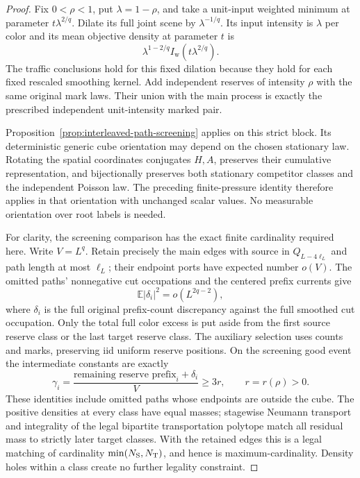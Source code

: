 \documentclass[11pt,reqno]{amsart}
\theoremstyle{definition}
\theoremstyle{remark}
\numberwithin{equation}{section}
\newcommand{\E}{\mathbb E}
\begin{document}
\begin{proof}
Fix \(0<\rho<1\), put \(\lambda=1-\rho\), and take a unit-input
weighted minimum at parameter \(t\lambda^{2/q}\). Dilate its full
joint scene by \(\lambda^{-1/q}\). Its input intensity is
\(\lambda\) per color and its mean objective density at parameter
\(t\) is
\begin{equation}
                  \lambda^{1-2/q}I_{\mathrm w}(t\lambda^{2/q}).
 \label{eq:interleaved-root-dilation}
\end{equation}
The traffic conclusions hold for this fixed dilation because they
hold for each fixed rescaled smoothing kernel. Add independent
reserves of intensity \(\rho\) with the same original mark laws.
Their union with the main process is exactly the prescribed
independent unit-intensity marked pair.

Proposition~\ref{prop:interleaved-path-screening} applies on this
strict block. Its deterministic generic cube orientation may depend
on the chosen stationary law. Rotating the spatial coordinates
conjugates \(H,A\), preserves their cumulative representation, and
bijectionally preserves both stationary competitor classes and the
independent Poisson law. The preceding finite-pressure identity
therefore applies in that orientation with unchanged scalar values.
No measurable orientation over root labels is needed.

For clarity, the screening comparison has the exact finite
cardinality required here. Write \(V=L^q\). Retain precisely the
main edges with source in \(Q_{L-4\ell_L}\) and path length at most
\(\ell_L\); their endpoint ports have expected number \(o(V)\).
The omitted paths' nonnegative cut occupations
and the centered prefix currents give
\[
 \E|\delta_i|^2=o(L^{2q-2}),
\]
where \(\delta_i\) is the full original prefix-count discrepancy
against the full smoothed cut occupation.
Only the total full color excess is put aside from the first source
reserve class or the last target reserve class. The auxiliary
selection uses counts and marks, preserving iid uniform reserve
positions. On the screening good event the intermediate constants
are exactly
\[
 \gamma_i=\frac{\text{remaining reserve prefix}_i+\delta_i}{V}
                 \ge3r,
 \qquad r=r(\rho)>0.
\]
These identities include omitted paths whose endpoints are outside
the cube. The positive densities at every class have equal masses;
stagewise Neumann transport and integrality of the legal bipartite
transportation polytope match all residual mass to strictly later
target classes. With the retained edges this is a legal matching
of cardinality \(\min(N_{\rm S},N_{\rm T})\), and hence is
maximum-cardinality. Density holes within a class create no further
legality constraint.


\end{proof}
\end{document}
